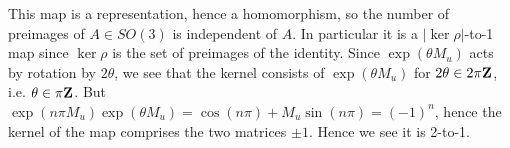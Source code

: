 \documentclass[12pt]{article}
\begin{document}
\begin{answer}
\begin{enumerate}[(a)]
This map is a representation, hence a homomorphism, so the number of preimages of $A\in SO(3)$ is independent of $A$. In particular it is a $|\ker\rho|$-to-1 map since $\ker\rho$ is the set of preimages of the identity. Since $\exp(\theta M_u)$ acts by rotation by $2\theta$, we see that the kernel consists of $\exp(\theta M_u)$ for $2\theta\in 2\pi\mathbf{Z}$, i.e. $\theta\in \pi\mathbf{Z}$. But $\exp(n\pi M_u)\exp(\theta M_u)=\cos(n\pi)+M_u\sin(n\pi)=(-1)^n$, hence the kernel of the map comprises the two matrices $\pm 1$. Hence we see it is 2-to-1.
\end{enumerate}
\end{answer}
\newpage
\end{document}
